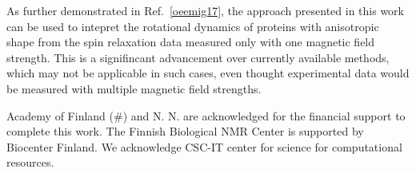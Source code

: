 \documentclass[pre,aps,floatfix,authordate1-4,twocolumn]{revtex4-1}
\begin{document}
As further demonstrated in Ref.~\ref{oeemig17}, the approach presented in this work can be used to intepret the
rotational dynamics of proteins with anisotropic shape from the
spin relaxation data measured only with one magnetic field strength.
This is a signifincant advancement over currently available methods,
which may not be applicable in such cases, even thought experimental
data would be measured with multiple magnetic field strengths.




\begin{acknowledgments}
  Academy of Finland (\#) and N. N. are acknowledged for the financial support
  to complete this work. The Finnish Biological NMR Center is supported by Biocenter Finland.
  We acknowledge CSC-IT center for science for computational resources.
\end{acknowledgments}


\end{document}
